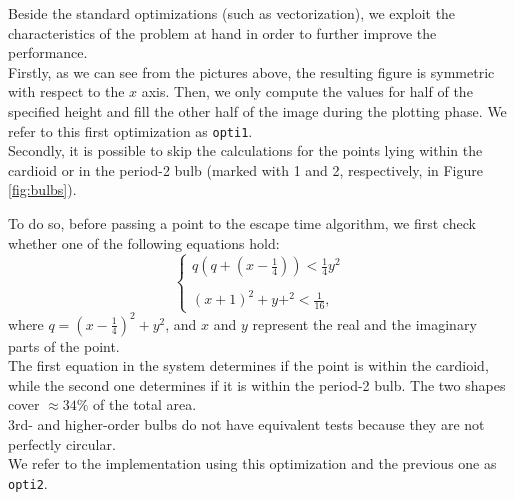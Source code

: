 \documentclass[11pt,a4paper]{article}
\begin{document}
\noindent
Beside the standard optimizations (such as vectorization), we exploit the characteristics of the problem at hand in order to further improve the performance.\\[-7pt]

Firstly, as we can see from the pictures above, the resulting figure is symmetric with respect to the $x$ axis.
Then, we only compute the values for half of the specified height and fill the other half of the image during the plotting phase.
We refer to this first optimization as \texttt{opti1}.\\[-7pt]

Secondly, it is possible to skip the calculations for the points lying within the cardioid or in the period-2 bulb (marked with 1 and 2, respectively, in Figure \ref{fig:bulbs}).
 
\noindent
To do so, before passing a point to the escape time algorithm, we first check whether one of the following equations hold:
\[
\left\{
\begin{array}{ll}
q \left(q + \left(x - \frac{1}{4}\right)\right) < \frac{1}{4}y^2\\
\\
\left(x+1\right)^2 + y+^2 < \frac{1}{16},
\end{array}
\right.
\]
where $q = \left(x - \frac{1}{4}\right)^2 + y^2$, and $x$ and $y$ represent the real and the imaginary parts of the point.\\
The first equation in the system determines if the point is within the cardioid, while the second one determines if it is within the period-2 bulb.
The two shapes cover $\approx34\%$ of the total area.\\
3rd- and higher-order bulbs do not have equivalent tests because they are not perfectly circular.\\
We refer to the implementation using this optimization and the previous one as \texttt{opti2}.\\[-7pt]
\end{document}
